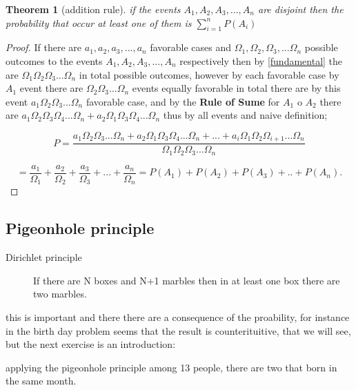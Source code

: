 \documentclass[10pt,a4paper]{article}
\newtheorem{theorem}{Theorem}[section]
\begin{document}
\begin{theorem}[addition rule]
\label{addition}
if the events $A_{1},A_{2},A_{3},...,A_{n}$ are disjoint then the probability that occur at least one of them is $\sum_{i=1}^{n}P(A_{i})$

\end{theorem}

\begin{proof}
If there are $a_{1},a_{2},a_{3},...,a_{n}$ favorable cases and $\Omega_{1},\Omega_{2},\Omega_{3},...\Omega_{n}$ possible outcomes to the events $A_{1},A_{2},A_{3},...,A_{n}$ respectively then  by \ref{fundamental} the are  $\Omega_{1}\Omega_{2} \Omega_{3}...\Omega_{n}$ in total possible outcomes, however by each favorable case by $A_{1}$ event there are $\Omega_{2}\Omega_{3}...\Omega_{n}$ events equally favorable in total there are by this event  $a_{1}\Omega_{2}\Omega_{3}...\Omega_{n}$  favorable case, and by the \textbf{Rule of Sume} for $A_{1}$ o $A_{2}$ there are $a_{1} \Omega_{2} \Omega_{3} \Omega_{4}...\Omega_{n} + a_{2} \Omega_{1} \Omega_{3} \Omega_{4}...\Omega_{n}$  thus by all events  and naive definition;


$$P = \frac{a_{1}\Omega_{2} \Omega_{3}...\Omega_{n}+a_{2} \Omega_{1} \Omega_{3} \Omega_{4}...\Omega_{n}+...+a_{i}\Omega_{1} \Omega_{2} \Omega_{i+1}... \Omega_{n}}{\Omega_{1}\Omega_{2}\Omega_{3}...\Omega_{n}}$$

$$= \dfrac{a_{1}}{\Omega_{1}}+ \dfrac{a_{2}}{\Omega_{2}}+ \dfrac{a_{3}}{\Omega_{3}}+...+\dfrac{a_{n}}{\Omega_{n}}= P(A_{1})+P(A_{2})+P(A_{3})+..+P(A_{n}).$$
 
\end{proof}


\subsection{Pigeonhole principle}

\begin{description}
\item[Dirichlet principle]
If there are N boxes and N+1 marbles then  in at least one box there are two marbles.
\end{description}

this is important and there there are a consequence of the proability, for instance in the birth day problem seems that the result is counterituitive, that we will see, but the next exercise is an introduction:

applying the pigeonhole principle among 13 people, there are two that born in the same month.
\end{document}
